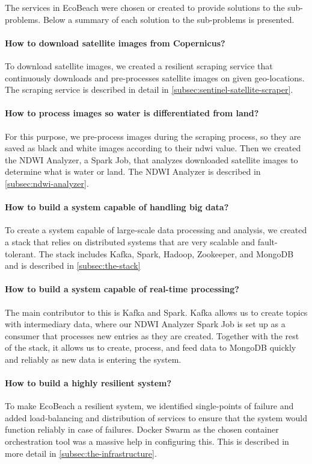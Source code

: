 \noindent
The services in EcoBeach were chosen or created to provide solutions to the sub-problems. Below a summary of each solution to the sub-problems is presented.

\paragraph{How to download satellite images from Copernicus?} To download satellite images, we created a resilient scraping service that continuously downloads and pre-processes satellite images on given geo-locations. The scraping service is described in detail in \autoref{subsec:sentinel-satellite-scraper}.

\paragraph{How to process images so water is differentiated from land?} For this purpose, we pre-process images during the scraping process, so they are saved as black and white images according to their \acrfull{ndwi} value. Then we created the NDWI Analyzer, a Spark Job, that analyzes downloaded satellite images to determine what is water or land. The NDWI Analyzer is described in \autoref{subsec:ndwi-analyzer}.

\paragraph{How to build a system capable of handling big data?} To create a system capable of large-scale data processing and analysis, we created a stack that relies on distributed systems that are very scalable and fault-tolerant. The stack includes Kafka, Spark, Hadoop, Zookeeper, and MongoDB and is described in \autoref{subsec:the-stack}

\paragraph{How to build a system capable of real-time processing?} The main contributor to this is Kafka and Spark. Kafka allows us to create topics with intermediary data, where our NDWI Analyzer Spark Job is set up as a consumer that processes new entries as they are created. Together with the rest of the stack, it allows us to create, process, and feed data to MongoDB quickly and reliably as new data is entering the system.

\paragraph{How to build a highly resilient system?} To make EcoBeach a resilient system, we identified single-points of failure and added load-balancing and distribution of services to ensure that the system would function reliably in case of failures. Docker Swarm as the chosen container orchestration tool was a massive help in configuring this. This is described in more detail in \autoref{subsec:the-infrastructure}.

